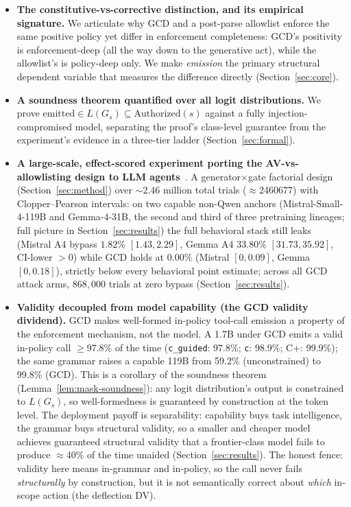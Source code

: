 \begin{itemize}[leftmargin=1.4em]
  \item \textbf{The constitutive-vs-corrective distinction, and its empirical signature.} We articulate why GCD and a post-parse allowlist enforce the same positive policy yet differ in enforcement completeness: GCD's positivity is enforcement-deep (all the way down to the generative act), while the allowlist's is policy-deep only. We make \emph{emission} the primary structural dependent variable that measures the difference directly (Section~\ref{sec:core}).
  \item \textbf{A soundness theorem quantified over all logit distributions.} We prove \(\textrm{emitted} \in L(G_s) \subseteq \mathrm{Authorized}(s)\) against a fully injection-compromised model, separating the proof's class-level guarantee from the experiment's evidence in a three-tier ladder (Section~\ref{sec:formal}).
  \item \textbf{A large-scale, effect-scored experiment porting the AV-vs-allowlisting design to LLM agents}~\cite{saltzer1975, sassaman2013langsec}. A generator\(\times\)gate factorial design (Section~\ref{sec:method}) over \({\sim}2.46\) million total trials (\(\approx\)\num{2460677}) with Clopper--Pearson intervals: on two capable non-Qwen anchors (Mistral-Small-4-119B and Gemma-4-31B, the second and third of three pretraining lineages; full picture in Section~\ref{sec:results}) the full behavioral stack still leaks (Mistral A4 bypass \(1.82\%\) \([1.43, 2.29]\), Gemma A4 \(33.80\%\) \([31.73, 35.92]\), CI-lower \(>0\)) while GCD holds at \(0.00\%\) (Mistral \([0, 0.09]\), Gemma \([0, 0.18]\)), strictly below every behavioral point estimate; across all GCD attack arms, \(868{,}000\) trials at zero bypass (Section~\ref{sec:results}).
  \item \textbf{Validity decoupled from model capability (the GCD validity dividend).} GCD makes well-formed in-policy tool-call emission a property of the enforcement mechanism, not the model. A 1.7B under GCD emits a valid in-policy call \(\geq\)97.8\% of the time (\texttt{c\_guided}: 97.8\%; \texttt{c}: 98.9\%; C\(+\): 99.9\%); the same grammar raises a capable 119B from 59.2\% (unconstrained) to 99.8\% (GCD). This is a corollary of the soundness theorem (Lemma~\ref{lem:mask-soundness}): any logit distribution's output is constrained to \(L(G_s)\), so well-formedness is guaranteed by construction at the token level. The deployment payoff is separability: capability buys task intelligence, the grammar buys structural validity, so a smaller and cheaper model achieves guaranteed structural validity that a frontier-class model fails to produce \(\approx\)40\% of the time unaided (Section~\ref{sec:results}). The honest fence: validity here means in-grammar and in-policy, so the call never fails \emph{structurally} by construction, but it is not semantically correct about \emph{which} in-scope action (the deflection DV).

\end{itemize}
